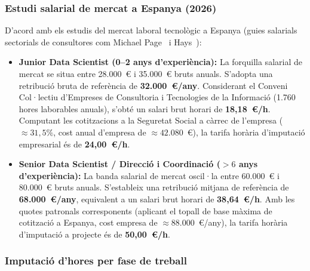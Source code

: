 \subsubsection{Estudi salarial de mercat a Espanya (2026)}

D'acord amb els estudis del mercat laboral tecnològic a Espanya (guies salarials sectorials de consultores com Michael Page~\cite{michael_page_tech_2025} i Hays~\cite{hays_guia_salarial_2025}):
\begin{itemize}
    \item \textbf{Junior Data Scientist (0--2 anys d'experiència):} La forquilla salarial de mercat se situa entre 28.000~€ i 35.000~€ bruts anuals. S'adopta una retribució bruta de referència de \textbf{32.000~€/any}. Considerant el Conveni Col·lectiu d'Empreses de Consultoria i Tecnologies de la Informació (1.760 hores laborables anuals), s'obté un salari brut horari de \textbf{18,18~€/h}. Computant les cotitzacions a la Seguretat Social a càrrec de l'empresa ($\approx 31{,}5\%$, cost anual d'empresa de $\approx 42.080$~€), la tarifa horària d'imputació empresarial és de \textbf{24,00~€/h}.
    \item \textbf{Senior Data Scientist / Direcció i Coordinació ($>6$ anys d'experiència):} La banda salarial de mercat oscil·la entre 60.000~€ i 80.000~€ bruts anuals. S'estableix una retribució mitjana de referència de \textbf{68.000~€/any}, equivalent a un salari brut horari de \textbf{38,64~€/h}. Amb les quotes patronals corresponents (aplicant el topall de base màxima de cotització a Espanya, cost empresa de $\approx 88.000$~€/any), la tarifa horària d'imputació a projecte és de \textbf{50,00~€/h}.
\end{itemize}

\subsubsection{Imputació d'hores per fase de treball}

